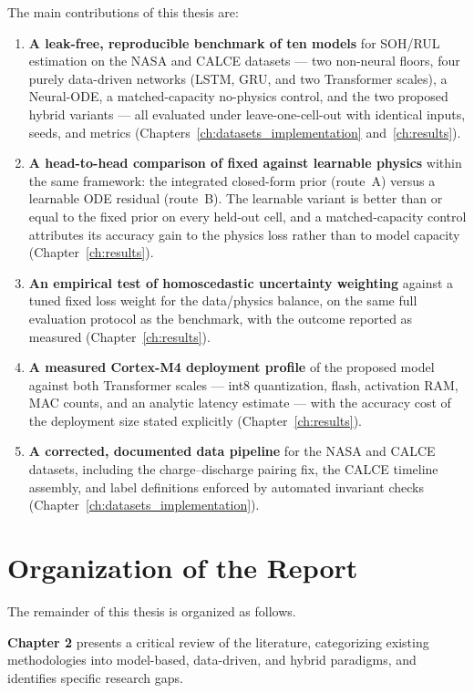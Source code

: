 The main contributions of this thesis are:

\begin{enumerate}
    \item \textbf{A leak-free, reproducible benchmark of ten models} for SOH/RUL estimation on the NASA and CALCE datasets --- two non-neural floors, four purely data-driven networks (LSTM, GRU, and two Transformer scales), a Neural-ODE, a matched-capacity no-physics control, and the two proposed hybrid variants --- all evaluated under leave-one-cell-out with identical inputs, seeds, and metrics (Chapters~\ref{ch:datasets_implementation} and~\ref{ch:results}).
    \item \textbf{A head-to-head comparison of fixed against learnable physics} within the same framework: the integrated closed-form prior (route~A) versus a learnable ODE residual (route~B). The learnable variant is better than or equal to the fixed prior on every held-out cell, and a matched-capacity control attributes its accuracy gain to the physics loss rather than to model capacity (Chapter~\ref{ch:results}).
    \item \textbf{An empirical test of homoscedastic uncertainty weighting} against a tuned fixed loss weight for the data/physics balance, on the same full evaluation protocol as the benchmark, with the outcome reported as measured (Chapter~\ref{ch:results}).
    \item \textbf{A measured Cortex-M4 deployment profile} of the proposed model against both Transformer scales --- int8 quantization, flash, activation RAM, MAC counts, and an analytic latency estimate --- with the accuracy cost of the deployment size stated explicitly (Chapter~\ref{ch:results}).
    \item \textbf{A corrected, documented data pipeline} for the NASA and CALCE datasets, including the charge--discharge pairing fix, the CALCE timeline assembly, and label definitions enforced by automated invariant checks (Chapter~\ref{ch:datasets_implementation}).
\end{enumerate}

\section{Organization of the Report}

The remainder of this thesis is organized as follows.

\textbf{Chapter 2} presents a critical review of the literature, categorizing existing methodologies into model-based, data-driven, and hybrid paradigms, and identifies specific research gaps.

